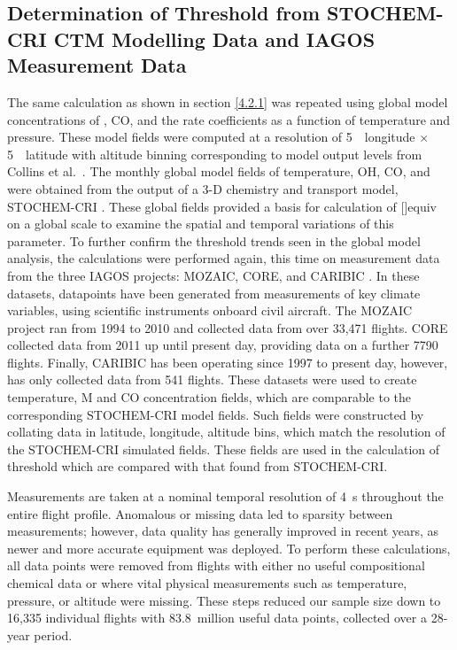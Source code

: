 \subsection{Determination of Threshold \texorpdfstring{}{NOx} from STOCHEM-CRI CTM Modelling Data and IAGOS Measurement Data}
\label{4.2.2}
The same calculation as shown in section \ref{4.2.1} was repeated using global model concentrations of , CO, and the rate coefficients as a function of temperature and pressure. These model fields were computed at a resolution of 5~\textdegree~longitude $\times$ 5~\textdegree~latitude with altitude binning corresponding to model output levels from Collins et al.~\cite{Collins1997}. The monthly global model fields of temperature, OH, CO, and  were obtained from the output of a 3-D chemistry and transport model, STOCHEM-CRI \cite{Fuglestvedt1999}. These global fields provided a basis for calculation of []equiv on a global scale to examine the spatial and temporal variations of this parameter. To further confirm the  threshold trends seen in the global model analysis, the calculations were performed again, this time on measurement data from the three IAGOS projects: MOZAIC, CORE, and CARIBIC \cite{Blot2021}. In these datasets, datapoints have been generated from measurements of key climate variables, using scientific instruments onboard civil aircraft. The MOZAIC project ran from 1994 to 2010 and collected data from over 33,471 flights. CORE collected data from 2011 up until present day, providing data on a further 7790 flights. Finally, CARIBIC has been operating since 1997 to present day, however, has only collected data from 541 flights. These datasets were used to create temperature, M and CO concentration fields, which are comparable to the corresponding STOCHEM-CRI model fields. Such fields were constructed by collating data in latitude, longitude, altitude bins, which match the resolution of the STOCHEM-CRI simulated fields. These fields are used in the calculation of  threshold which are compared with that found from STOCHEM-CRI.

Measurements are taken at a nominal temporal resolution of 4~s throughout the entire flight profile. Anomalous or missing data led to sparsity between measurements; however, data quality has generally improved in recent years, as newer and more accurate equipment was deployed. To perform these calculations, all data points were removed from flights with either no useful compositional chemical data or where vital physical measurements such as temperature, pressure, or altitude were missing. These steps reduced our sample size down to 16,335 individual flights with 83.8~million useful data points, collected over a 28-year period.

